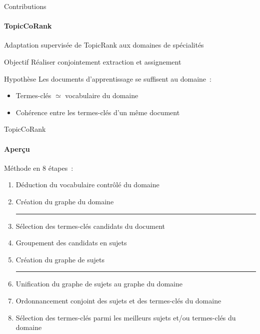 \begin{frame}{Contributions}\framesubtitle{TopicCoRank}
  Adaptation supervisée de TopicRank aux domaines de spécialités

  \vspace{1em}

  \begin{block}{Objectif}
    Réaliser conjointement extraction et assignement
  \end{block}

  \vspace{1em}

  \begin{block}{Hypothèse}
    Les documents d'apprentissage se suffisent au domaine~:
    \begin{itemize}
      \item{Termes-clés $\simeq$ vocabulaire du domaine}
      \item{Cohérence entre les termes-clés d'un même document}
    \end{itemize}
  \end{block}
\end{frame}

\begin{frame}{TopicCoRank}\framesubtitle{Aperçu}
  Méthode en 8 étapes~:
  \begin{enumerate}
    \item{Déduction du vocabulaire contrôlé du domaine}
    \item{Création du graphe du domaine}
    \vspace{.75em}\hrule\vspace{.5em}
    \item{Sélection des termes-clés candidats du document}
    \item{Groupement des candidats en sujets}
    \item{Création du graphe de sujets}
    \vspace{.75em}\hrule\vspace{.5em}
    \item{Unification du graphe de sujets au graphe du domaine}
    \item{Ordonnancement conjoint des sujets et des termes-clés du domaine}
    \item{Sélection des termes-clés parmi les meilleurs sujets et/ou termes-clés
          du domaine}
  \end{enumerate}
\end{frame}

